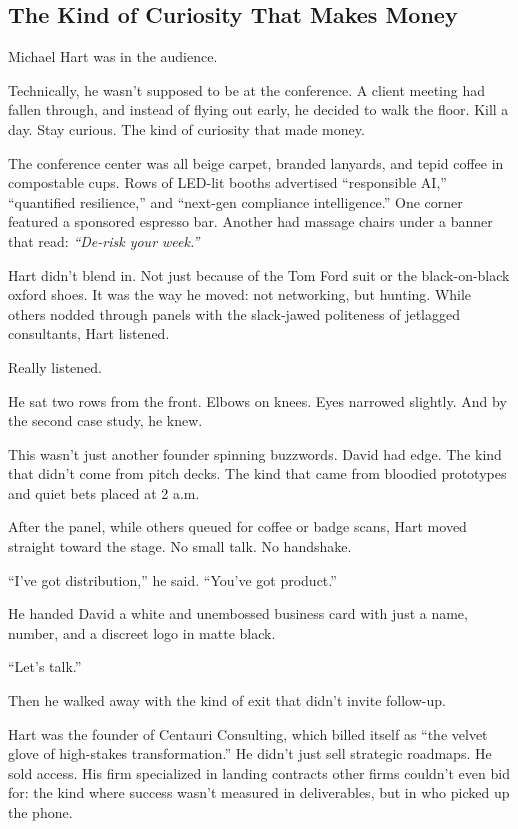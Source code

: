 \subsection{The Kind of Curiosity That Makes Money}

Michael Hart was in the audience.

Technically, he wasn’t supposed to be at the conference. A client meeting had fallen through, and instead 
of flying out early, he decided to walk the floor. Kill a day. Stay curious. The kind of curiosity 
that made money.

The conference center was all beige carpet, branded lanyards, and tepid coffee in compostable cups. Rows of 
LED-lit booths advertised ``responsible AI,'' ``quantified resilience,'' and ``next-gen compliance intelligence.''
One corner featured a sponsored espresso bar. Another had massage chairs under a banner that read: 
\textit{``De-risk your week.''}

Hart didn’t blend in. Not just because of the Tom Ford suit or the black-on-black oxford shoes. It was the 
way he moved: not networking, but hunting. While others nodded through panels with the slack-jawed politeness 
of jetlagged consultants, Hart listened.

Really listened.

He sat two rows from the front. Elbows on knees. Eyes narrowed slightly. And by the second case study, he knew.

This wasn’t just another founder spinning buzzwords. David had edge. The kind that didn’t come from pitch decks. 
The kind that came from bloodied prototypes and quiet bets placed at 2 a.m.

After the panel, while others queued for coffee or badge scans, Hart moved straight toward the stage. No small talk. 
No handshake.

``I’ve got distribution,'' he said. ``You’ve got product.''

He handed David a white and unembossed business card with just a name, number, and a discreet logo in matte black.

``Let’s talk.''

Then he walked away with the kind of exit that didn’t invite follow-up.

Hart was the founder of Centauri Consulting, which billed itself as ``the velvet glove of high-stakes transformation.''
He didn’t just sell strategic roadmaps. He sold access. His firm specialized in landing contracts other firms 
couldn’t even bid for: the kind where success wasn’t measured in deliverables, but in who picked up the phone.

